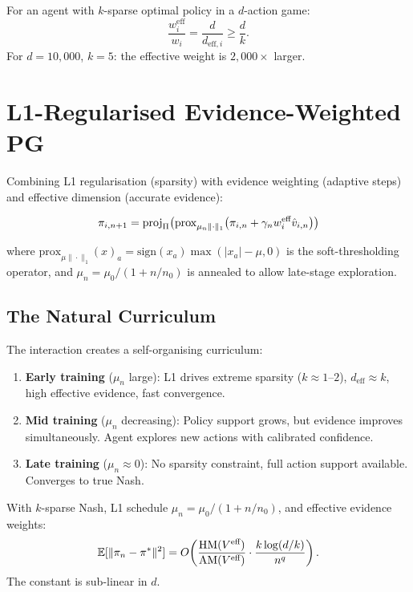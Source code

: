 \begin{theorem}
For an agent with $k$-sparse optimal policy in a $d$-action game:
\begin{equation}
    \frac{w_i^{\text{eff}}}{w_i} = \frac{d}{d_{\text{eff},i}} \geq \frac{d}{k}.
\end{equation}
For $d = 10{,}000$, $k = 5$: the effective weight is $2{,}000\times$ larger.
\end{theorem}


\section{L1-Regularised Evidence-Weighted PG}

Combining L1 regularisation (sparsity) with evidence weighting (adaptive steps) and effective dimension (accurate evidence):

\begin{equation}
    \pi_{i,n+1} = \operatorname{proj}_\Pi\bigl(\text{prox}_{\mu_n \|\cdot\|_1}\bigl(\pi_{i,n} + \gamma_n w_i^{\text{eff}} \hat{v}_{i,n}\bigr)\bigr)
\end{equation}

where $\text{prox}_{\mu\|\cdot\|_1}(x)_a = \text{sign}(x_a)\max(|x_a| - \mu, 0)$ is the soft-thresholding operator, and $\mu_n = \mu_0/(1 + n/n_0)$ is annealed to allow late-stage exploration.

\subsection{The Natural Curriculum}

The interaction creates a self-organising curriculum:

\begin{enumerate}
    \item \textbf{Early training} ($\mu_n$ large): L1 drives extreme sparsity ($k \approx 1$--$2$), $d_{\text{eff}} \approx k$, high effective evidence, fast convergence.
    \item \textbf{Mid training} ($\mu_n$ decreasing): Policy support grows, but evidence improves simultaneously. Agent explores new actions with calibrated confidence.
    \item \textbf{Late training} ($\mu_n \approx 0$): No sparsity constraint, full action support available. Converges to true Nash.
\end{enumerate}

\begin{theorem}\label{thm:sparse-ewpg}
With $k$-sparse Nash, L1 schedule $\mu_n = \mu_0/(1+n/n_0)$, and effective evidence weights:
\begin{equation}
    \mathbb{E}[\|\pi_n - \pi^*\|^2] = O\!\left(\frac{\text{HM}(V^{\text{eff}})}{\text{AM}(V^{\text{eff}})} \cdot \frac{k \log(d/k)}{n^q}\right).
\end{equation}
The constant is sub-linear in $d$.
\end{theorem}

